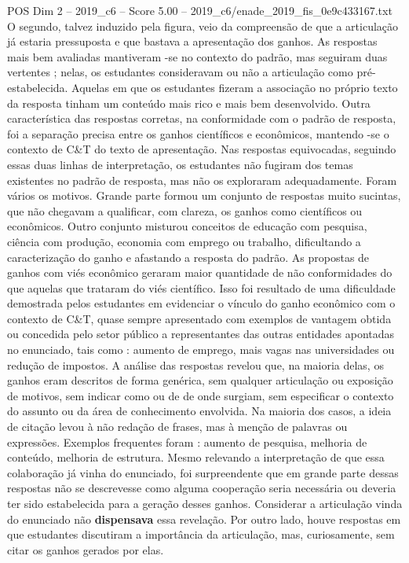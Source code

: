 \begin{textsample}{POS Dim 2 – 2019\_c6 – Score 5.00 – 2019\_c6/enade\_2019\_fis\_0e9c433167.txt}
O segundo, talvez induzido pela figura, veio da compreensão de que a articulação já estaria pressuposta e que bastava a apresentação dos ganhos.
As respostas mais bem avaliadas mantiveram -se no contexto do padrão, mas seguiram duas vertentes ; nelas, os estudantes consideravam ou não a articulação como pré-estabelecida.
Aquelas em que os estudantes fizeram a associação no próprio texto da resposta tinham um conteúdo mais rico e mais bem desenvolvido.
Outra característica das respostas corretas, na conformidade com o padrão de resposta, foi a separação precisa entre os ganhos científicos e econômicos, mantendo -se o contexto de C\&T do texto de apresentação.
Nas respostas equivocadas, seguindo essas duas linhas de interpretação, os estudantes não fugiram dos temas existentes no padrão de resposta, mas não os exploraram adequadamente.
Foram vários os motivos.
Grande parte formou um conjunto de respostas muito sucintas, que não chegavam a qualificar, com clareza, os ganhos como científicos ou econômicos.
Outro conjunto misturou conceitos de educação com pesquisa, ciência com produção, economia com emprego ou trabalho, dificultando a caracterização do ganho e afastando a resposta do padrão.
As propostas de ganhos com viés econômico geraram maior quantidade de não conformidades do que aquelas que trataram do viés científico.
Isso foi resultado de uma dificuldade demostrada pelos estudantes em evidenciar o vínculo do ganho econômico com o contexto de C\&T, quase sempre apresentado com exemplos de vantagem obtida ou concedida pelo setor público a representantes das outras entidades apontadas no enunciado, tais como : aumento de emprego, mais vagas nas universidades ou redução de impostos.
A análise das respostas revelou que, na maioria delas, os ganhos eram descritos de forma genérica, sem qualquer articulação ou exposição de motivos, sem indicar como ou de de onde surgiam, sem especificar o contexto do assunto ou da área de conhecimento envolvida.
Na maioria dos casos, a ideia de citação levou à não redação de frases, mas à menção de palavras ou expressões.
Exemplos frequentes foram : aumento de pesquisa, melhoria de conteúdo, melhoria de estrutura.
Mesmo relevando a interpretação de que essa colaboração já vinha do enunciado, foi surpreendente que em grande parte dessas respostas não se descrevesse como alguma cooperação seria necessária ou deveria ter sido estabelecida para a geração desses ganhos.
Considerar a articulação vinda do enunciado não \textbf{dispensava} essa revelação.
Por outro lado, houve respostas em que estudantes discutiram a importância da articulação, mas, curiosamente, sem citar os ganhos gerados por elas.

\end{textsample}
